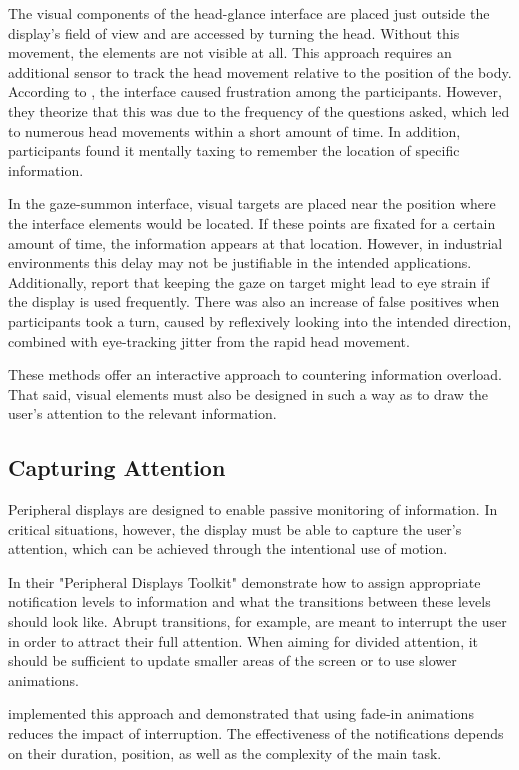 The visual components of the head-glance interface are placed just outside the display's field of view and are accessed by turning the head. Without this movement, the elements are not visible at all. This approach requires an additional sensor to track the head movement relative to the position of the body.
According to \textcite{luGlanceableAREvaluating2020}, the interface caused frustration among the participants. However, they theorize that this was due to the frequency of the questions asked, which led to numerous head movements within a short amount of time. In addition, participants found it mentally taxing to remember the location of specific information.

In the gaze-summon interface, visual targets are placed near the position where the interface elements would be located. If these points are fixated for a certain amount of time, the information appears at that location. However, in industrial environments this delay may not be justifiable in the intended applications. Additionally, \textcite{luGlanceableAREvaluating2020} report that keeping the gaze on target might lead to eye strain if the display is used frequently. There was also an increase of false positives when participants took a turn, caused by reflexively looking into the intended direction, combined with eye-tracking jitter from the rapid head movement.

These methods offer an interactive approach to countering information overload. That said, visual elements must also be designed in such a way as to draw the user's attention to the relevant information.

\subsection{Capturing Attention}

Peripheral displays are designed to enable passive monitoring of information. In critical situations, however, the display must be able to capture the user's attention, which can be achieved through the intentional use of motion.

In their "Peripheral Displays Toolkit" \textcite{matthewsToolkitManagingUser2004} demonstrate how to assign appropriate notification levels to information and what the transitions between these levels should look like.
Abrupt transitions, for example, are meant to interrupt the user in order to attract their full attention. When aiming for divided attention, it should be sufficient to update smaller areas of the screen or to use slower animations.

\textcite{janakaNotiFadeMinimizingOHMD2023} implemented this approach and demonstrated that using fade-in animations reduces the impact of interruption. The effectiveness of the notifications depends on their duration, position, as well as the complexity of the main task.


